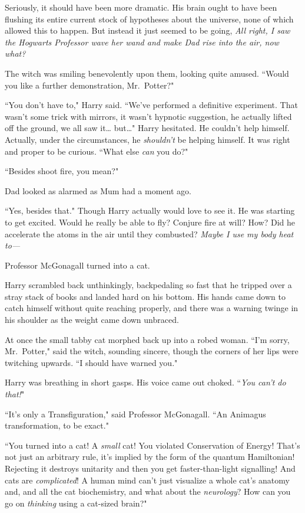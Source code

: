 Seriously, it should have been more dramatic. His brain ought to have been flushing its entire current stock of hypotheses about the universe, none of which allowed this to happen. But instead it just seemed to be going, \emph{All right, I saw the Hogwarts Professor wave her wand and make Dad rise into the air, now what?}

The witch was smiling benevolently upon them, looking quite amused. ``Would you like a further demonstration, Mr.~Potter?"

``You don't have to," Harry said. ``We've performed a definitive experiment. That wasn't some trick with mirrors, it wasn't hypnotic suggestion, he actually lifted off the ground, we all saw it{\ldots} but{\ldots}" Harry hesitated. He couldn't help himself. Actually, under the circumstances, he \emph{shouldn't} be helping himself. It was right and proper to be curious. ``What else \emph{can} you do?"

``Besides shoot fire, you mean?"

Dad looked as alarmed as Mum had a moment ago.

``Yes, besides that." Though Harry actually would love to see it. He was starting to get excited. Would he really be able to fly? Conjure fire at will? How? Did he accelerate the atoms in the air until they combusted? \emph{Maybe I use my body heat to---}

Professor McGonagall turned into a cat.

Harry scrambled back unthinkingly, backpedaling so fast that he tripped over a stray stack of books and landed hard on his bottom. His hands came down to catch himself without quite reaching properly, and there was a warning twinge in his shoulder as the weight came down unbraced.

At once the small tabby cat morphed back up into a robed woman. ``I'm sorry, Mr.~Potter," said the witch, sounding sincere, though the corners of her lips were twitching upwards. ``I should have warned you."

Harry was breathing in short gasps. His voice came out choked. ``\emph{You can't \emph{do} that!}"

``It's only a Transfiguration," said Professor McGonagall. ``An Animagus transformation, to be exact."

``You turned into a cat! A \emph{small} cat! You violated Conservation of Energy! That's not just an arbitrary rule, it's implied by the form of the quantum Hamiltonian! Rejecting it destroys unitarity and then you get faster-than-light signalling! And cats are \emph{complicated}! A human mind can't just visualize a whole cat's anatomy and, and all the cat biochemistry, and what about the \emph{neurology}? How can you go on \emph{thinking} using a cat-sized brain?"

